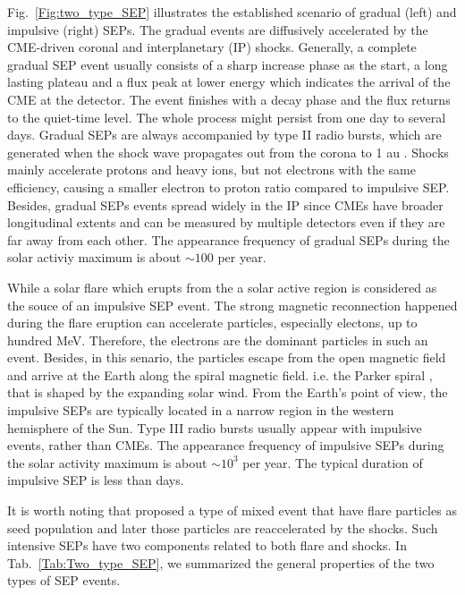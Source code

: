 Fig.~\ref{Fig:two_type_SEP} illustrates the established scenario of gradual (left) and impulsive (right) \acp{SEP}.
The gradual events are diffusively accelerated by the \ac{CME}-driven coronal and interplanetary (IP) shocks. Generally, a complete gradual \ac{SEP} event usually consists of a sharp increase phase as the start, a long lasting plateau and a flux peak at lower energy which indicates the arrival of the \ac{CME} at the detector. The event finishes with a decay phase and the flux returns to the quiet-time level. The whole process might persist from one day to several days. Gradual \acp{SEP} are always accompanied by type II radio bursts, which are generated when the shock wave propagates out from the corona to 1 au \citep{Gopalswamy2006GMS}.
Shocks mainly accelerate protons and heavy ions, but not electrons with the same efficiency, causing a smaller electron to proton ratio compared to impulsive \ac{SEP}. Besides, gradual \acp{SEP} events spread widely in the IP since \acp{CME} have broader longitudinal extents and can be measured by multiple detectors even if they are far away from each other. 
The appearance frequency of gradual \acp{SEP} during the solar activiy maximum is about $\sim 100$ per year.

While a solar flare which erupts from the a solar active region is considered as the souce of an impulsive \ac{SEP} event. The strong magnetic reconnection happened during the flare eruption can accelerate particles, especially electons, up to hundred MeV. Therefore, the electrons are the dominant particles in such an event. Besides, in this senario, the particles escape from the open magnetic field and arrive at the Earth along the spiral magnetic field. i.e. the Parker spiral \citep{Parker-1958}, that is shaped by the expanding solar wind. From the Earth's point of view, the impulsive \acp{SEP} are typically located in a narrow region in the western hemisphere of the Sun. Type III radio bursts usually appear with impulsive events, rather than \acp{CME}.
The appearance frequency of impulsive \acp{SEP} during the solar activity maximum is about $\sim 10^3$ per year. The typical duration of impulsive \ac{SEP} is less than days.

It is worth noting that \citet{cane2003two} proposed a type of mixed event that have flare particles as seed population and later those particles are reaccelerated by the shocks. Such intensive \acp{SEP} have two components related to both flare and shocks.  %
In Tab.~\ref{Tab:Two_type_SEP}, we summarized the general properties of the two types of \ac{SEP} events.

